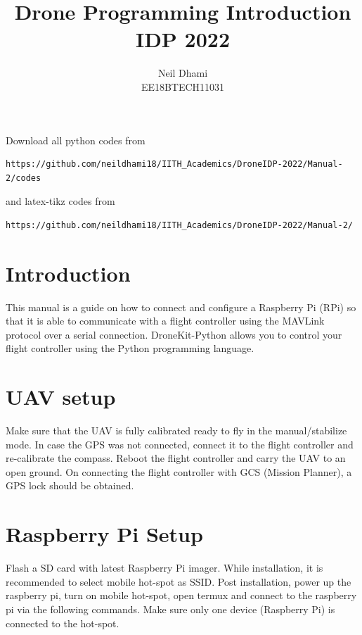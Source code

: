 \documentclass{article}
\begin{document}
\title{\vspace{-2.0cm}Drone Programming Introduction\\IDP 2022}

\author{Neil Dhami \\EE18BTECH11031	}

\maketitle
Download all python codes from 
\begin{lstlisting}
https://github.com/neildhami18/IITH_Academics/DroneIDP-2022/Manual-2/codes
\end{lstlisting}

%
and latex-tikz codes from 
%
\begin{lstlisting}
https://github.com/neildhami18/IITH_Academics/DroneIDP-2022/Manual-2/
\end{lstlisting}

\section{Introduction}
This manual is a guide on how to connect and configure a Raspberry Pi (RPi) so that it is able to communicate with a flight controller using the MAVLink protocol over a serial connection. DroneKit-Python allows you to control your flight controller using the Python programming language. 

\section{UAV setup}
Make sure that the UAV is fully calibrated ready to fly in the manual/stabilize mode. In case the GPS was not connected, connect it to the flight controller and re-calibrate the compass. Reboot the flight controller and carry the UAV to an open ground. On connecting the flight controller with GCS (Mission Planner), a GPS lock should be obtained. 

\section{Raspberry Pi Setup}
Flash a SD card with latest Raspberry Pi imager. While installation, it is recommended to select mobile hot-spot as SSID. Post installation, power up the raspberry pi, turn on mobile hot-spot, open termux and connect to the raspberry pi via the following commands. Make sure only one device (Raspberry Pi) is connected to the hot-spot.
\end{document}
